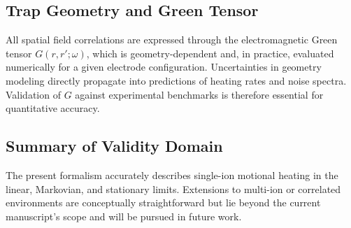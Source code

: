 \subsection{Trap Geometry and Green Tensor}
All spatial field correlations are expressed through the electromagnetic Green tensor
\(G(r,r';\omega)\), which is geometry-dependent and, in practice,
evaluated numerically for a given electrode configuration.
Uncertainties in geometry modeling directly propagate into predictions
of heating rates and noise spectra.  
Validation of \(G\) against experimental benchmarks is therefore essential
for quantitative accuracy.

\subsection{Summary of Validity Domain}
The present formalism accurately describes single-ion motional heating
in the linear, Markovian, and stationary limits.
Extensions to multi-ion or correlated environments are conceptually straightforward
but lie beyond the current manuscript's scope and will be pursued in future work.
